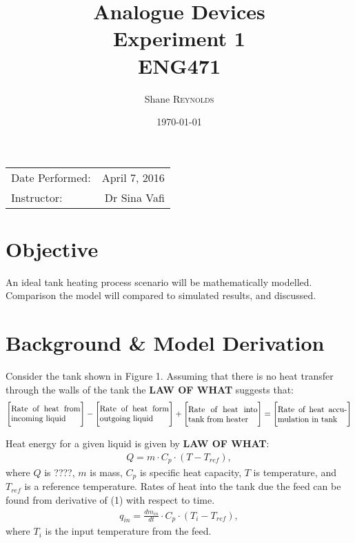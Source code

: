 \documentclass{article}
\title{Analogue Devices \\ Experiment 1 \\ ENG471} %
\author{Shane \textsc{Reynolds}} %
\date{\today} %
\begin{document}
\maketitle %

\begin{center}
\begin{tabular}{l r}
Date Performed: & April 7, 2016 \\ %
Instructor: & Dr Sina Vafi %
\end{tabular}
\end{center}



\section{Objective}

An ideal tank heating process scenario will be mathematically modelled. Comparison the model will compared to simulated results, and discussed.


\section{Background \& Model Derivation}
Consider the tank shown in Figure 1. Assuming that there is no heat transfer through the walls of the tank the \textbf{LAW OF WHAT} suggests that:
\begin{align*}
\Bigg[\parbox{3cm}{Rate of heat from incoming liquid}\Bigg] - \Bigg[\parbox{3cm}{Rate of heat form outgoing liquid}\Bigg] + \Bigg[\parbox{3cm}{Rate of heat into tank from heater}\Bigg] = \Bigg[\parbox{3cm}{Rate of heat accumulation in tank}\Bigg]
\end{align*}

Heat energy for a given liquid is given by \textbf{LAW OF WHAT}:
\begin{align}
Q = m \cdot C_p \cdot (T - T_{ref}),
\end{align}
where $Q$ is ????, $m$ is mass, $C_p$ is specific heat capacity, $T$ is temperature, and $T_{ref}$ is a reference temperature. Rates of heat into the tank due the feed can be found from derivative of (1) with respect to time.
\begin{align}
q_{in} = \frac{dm_{in}}{dt} \cdot C_p \cdot (T_i - T_{ref}),
\end{align}
where $T_i$ is the input temperature from the feed.
\end{document}
